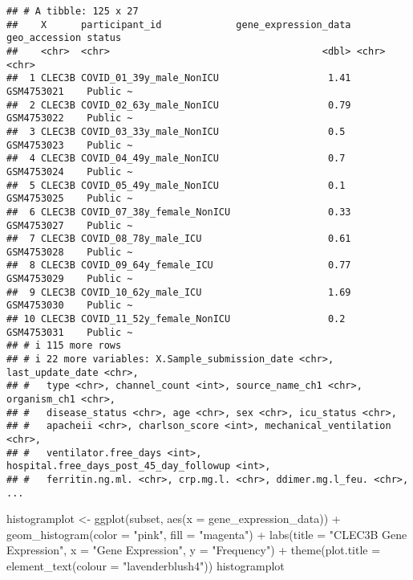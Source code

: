 \documentclass[
]{article}
\newenvironment{Shaded}{\begin{snugshade}}{\end{snugshade}}
\newcommand{\AttributeTok}[1]{\textcolor[rgb]{0.77,0.63,0.00}{#1}}
\newcommand{\FunctionTok}[1]{\textcolor[rgb]{0.00,0.00,0.00}{#1}}
\newcommand{\NormalTok}[1]{#1}
\newcommand{\OtherTok}[1]{\textcolor[rgb]{0.56,0.35,0.01}{#1}}
\newcommand{\SpecialCharTok}[1]{\textcolor[rgb]{0.00,0.00,0.00}{#1}}
\newcommand{\StringTok}[1]{\textcolor[rgb]{0.31,0.60,0.02}{#1}}
\begin{document}
\begin{verbatim}
## # A tibble: 125 x 27
##    X      participant_id             gene_expression_data geo_accession status  
##    <chr>  <chr>                                     <dbl> <chr>         <chr>   
##  1 CLEC3B COVID_01_39y_male_NonICU                   1.41 GSM4753021    Public ~
##  2 CLEC3B COVID_02_63y_male_NonICU                   0.79 GSM4753022    Public ~
##  3 CLEC3B COVID_03_33y_male_NonICU                   0.5  GSM4753023    Public ~
##  4 CLEC3B COVID_04_49y_male_NonICU                   0.7  GSM4753024    Public ~
##  5 CLEC3B COVID_05_49y_male_NonICU                   0.1  GSM4753025    Public ~
##  6 CLEC3B COVID_07_38y_female_NonICU                 0.33 GSM4753027    Public ~
##  7 CLEC3B COVID_08_78y_male_ICU                      0.61 GSM4753028    Public ~
##  8 CLEC3B COVID_09_64y_female_ICU                    0.77 GSM4753029    Public ~
##  9 CLEC3B COVID_10_62y_male_ICU                      1.69 GSM4753030    Public ~
## 10 CLEC3B COVID_11_52y_female_NonICU                 0.2  GSM4753031    Public ~
## # i 115 more rows
## # i 22 more variables: X.Sample_submission_date <chr>, last_update_date <chr>,
## #   type <chr>, channel_count <int>, source_name_ch1 <chr>, organism_ch1 <chr>,
## #   disease_status <chr>, age <chr>, sex <chr>, icu_status <chr>,
## #   apacheii <chr>, charlson_score <int>, mechanical_ventilation <chr>,
## #   ventilator.free_days <int>, hospital.free_days_post_45_day_followup <int>,
## #   ferritin.ng.ml. <chr>, crp.mg.l. <chr>, ddimer.mg.l_feu. <chr>, ...
\end{verbatim}

\begin{Shaded}
\begin{Highlighting}[]
\NormalTok{histogramplot }\OtherTok{\textless{}{-}} \FunctionTok{ggplot}\NormalTok{(subset, }\FunctionTok{aes}\NormalTok{(}\AttributeTok{x =}\NormalTok{ gene\_expression\_data)) }\SpecialCharTok{+} 
  \FunctionTok{geom\_histogram}\NormalTok{(}\AttributeTok{color =} \StringTok{"pink"}\NormalTok{, }\AttributeTok{fill =} \StringTok{"magenta"}\NormalTok{) }\SpecialCharTok{+}
  \FunctionTok{labs}\NormalTok{(}\AttributeTok{title =} \StringTok{"CLEC3B Gene Expression"}\NormalTok{, }\AttributeTok{x =} \StringTok{"Gene Expression"}\NormalTok{, }\AttributeTok{y =} \StringTok{"Frequency"}\NormalTok{) }\SpecialCharTok{+}
    \FunctionTok{theme}\NormalTok{(}\AttributeTok{plot.title =} \FunctionTok{element\_text}\NormalTok{(}\AttributeTok{colour =} \StringTok{"lavenderblush4"}\NormalTok{))}
\NormalTok{histogramplot}
\end{Highlighting}
\end{Shaded}
\end{document}
